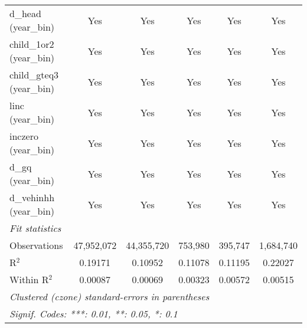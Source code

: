 \begin{tabular}{lccccc}
d\_head (year\_bin) & Yes & Yes & Yes & Yes & Yes\\
child\_1or2 (year\_bin) & Yes & Yes & Yes & Yes & Yes\\
child\_gteq3 (year\_bin) & Yes & Yes & Yes & Yes & Yes\\
linc (year\_bin) & Yes & Yes & Yes & Yes & Yes\\
inczero (year\_bin) & Yes & Yes & Yes & Yes & Yes\\
d\_gq (year\_bin) & Yes & Yes & Yes & Yes & Yes\\
d\_vehinhh (year\_bin) & Yes & Yes & Yes & Yes & Yes\\
\midrule \emph{Fit statistics}&  & & & & \\
Observations & 47,952,072&44,355,720&753,980&395,747&1,684,740\\
R$^2$ & 0.19171&0.10952&0.11078&0.11195&0.22027\\
Within R$^2$ & 0.00087&0.00069&0.00323&0.00572&0.00515\\
\midrule\midrule\multicolumn{6}{l}{\emph{Clustered (czone) standard-errors in parentheses}}\\
\multicolumn{6}{l}{\emph{Signif. Codes: ***: 0.01, **: 0.05, *: 0.1}}\\
\end{tabular}


